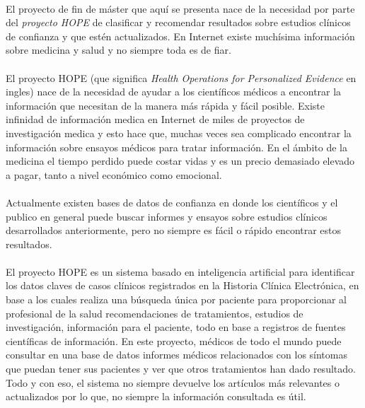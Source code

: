 \documentclass[10pt,a4paper,oneside]{book}
\begin{document}
\paragraph{}
El proyecto de fin de máster que aquí se presenta nace de la necesidad por parte del \textit{proyecto HOPE} de clasificar y recomendar resultados sobre estudios clínicos de confianza y que estén actualizados. En Internet existe muchísima información sobre medicina y salud y no siempre toda es de fiar.

\paragraph{}
El proyecto HOPE (que significa \textit{Health Operations for Personalized Evidence} en ingles) nace de la necesidad de ayudar a los científicos médicos a encontrar la información que necesitan de la manera más rápida y fácil posible. Existe infinidad de información medica en Internet de miles de proyectos de investigación medica y esto hace que, muchas veces sea complicado encontrar la información sobre ensayos médicos para tratar información. En el ámbito de la medicina el tiempo perdido puede costar vidas y es un precio demasiado elevado a pagar, tanto a nivel económico como emocional.

\paragraph{}
Actualmente existen bases de datos de confianza en donde los científicos y el publico en general puede buscar informes y ensayos sobre estudios clínicos desarrollados anteriormente, pero no siempre es fácil o rápido encontrar estos resultados.

\paragraph{}
El proyecto HOPE es un sistema basado en inteligencia artificial para identificar los datos claves de casos clínicos registrados en la Historia Clínica Electrónica, en base a los cuales realiza una búsqueda única por paciente para proporcionar al profesional de la salud recomendaciones de tratamientos, estudios de investigación, información para el paciente, todo en base a registros de fuentes científicas de información. En este proyecto, médicos de todo el mundo puede consultar en una base de datos informes médicos relacionados con los síntomas que puedan tener sus pacientes y ver que otros tratamientos han dado resultado. Todo y con eso, el sistema no siempre devuelve los artículos más relevantes o actualizados por lo que, no siempre la información consultada es útil.
\end{document}
